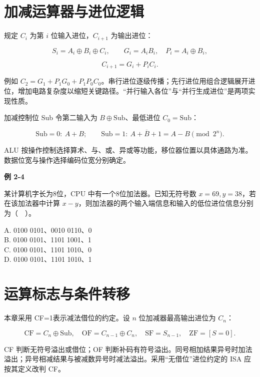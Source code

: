 \section{加减运算器与进位逻辑}\label{CO02-adder}

规定 \(C_i\) 为第 \(i\) 位输入进位，\(C_{i+1}\) 为输出进位：

\[S_i=A_i\oplus B_i\oplus C_i,\qquad G_i=A_iB_i,\quad P_i=A_i\oplus B_i,\]

\[C_{i+1}=G_i+P_iC_i.\]

例如 \(C_2=G_1+P_1G_0+P_1P_0C_0\)。串行进位逐级传播；先行进位用组合逻辑展开进位，增加电路复杂度以缩短关键路径。``并行输入各位''与``并行生成进位''是两项实现性质。

加减控制位 Sub 令第二输入为 \(B\oplus\mathrm{Sub}\)、最低进位 \(C_0=\mathrm{Sub}\)：

\[\mathrm{Sub}=0:\ A+B;\qquad \mathrm{Sub}=1:\ A+\overline B+1=A-B\pmod{2^n}.\]

ALU 按操作控制选择算术、与、或、异或等功能，移位器位置以具体通路为准。数据位宽与操作选择编码位宽分别确定。

\par\medskip{}\noindent\hypertarget{CO02-E04}{}\label{CO02-E04}\textbf{例 2-4}\par\nobreak\smallskip

某计算机字长为8位，CPU 中有一个8位加法器。已知无符号数 \(x=69,y=38\)，若在该加法器中计算 \(x-y\)，则加法器的两个输入端信息和输入的低位进位信息分别为（　）。

A. 0100 0101、0010 0110、0\\
B. 0100 0101、1101 1001、1\\
C. 0100 0101、1101 1010、0\\
D. 0100 0101、1101 1010、1

\section{运算标志与条件转移}\label{CO02-flags}

本章采用 CF=1表示减法借位的约定。设 \(n\) 位加减器最高输出进位为 \(C_n\)：

\[\mathrm{CF}=C_n\oplus\mathrm{Sub},\quad\mathrm{OF}=C_{n-1}\oplus C_n,\quad\mathrm{SF}=S_{n-1},\quad\mathrm{ZF}=[S=0].\]

CF 判断无符号溢出或借位；OF 判断补码有符号溢出。同号相加结果异号时加法溢出；异号相减结果与被减数异号时减法溢出。采用``无借位''进位约定的 ISA 应按其定义改判 CF。

